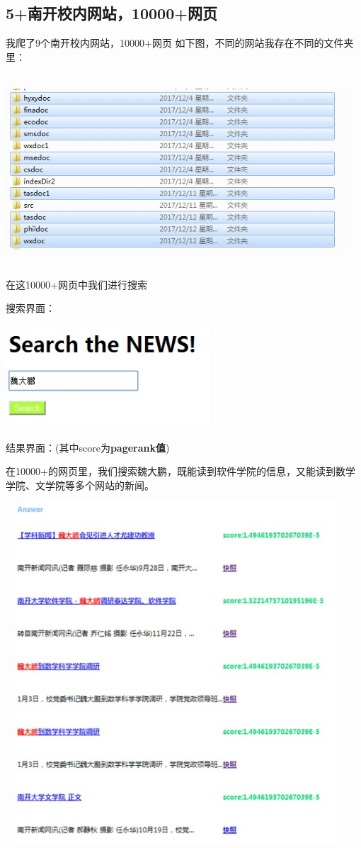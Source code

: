 ﻿\documentclass[UTF8]{ctexart}
\begin{document}
\begin{flushleft}
\subsection{5+南开校内网站，10000+网页}
我爬了9个南开校内网站，10000+网页
如下图，不同的网站我存在不同的文件夹里：
\par{}
\includegraphics[width=5.00in,height=2.80in]{figure22.jpg}
\par{}
在这10000+网页中我们进行搜索
\par{}
搜索界面：
\par{}
\includegraphics[width=3.00in,height=1.50in]{figure7.jpg}
\par{}
结果界面：(其中score为\textbf{pagerank值})
\par{}
在10000+的网页里，我们搜索魏大鹏，既能读到软件学院的信息，又能读到数学学院、文学院等多个网站的新闻。
\par{}
\includegraphics[width=5.00in,height=5.00in]{figure8.jpg}

\end{flushleft}
\end{document}
